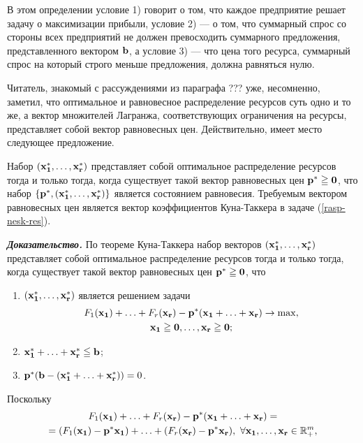     В этом определении условие 1) говорит о том, что каждое
    предприятие решает задачу о максимизации прибыли, условие 2) ---
    о том, что суммарный спрос со стороны всех предприятий не должен
    превосходить суммарного предложения, представленного вектором
    $\mathbf{b}$, а условие 3) --- что цена того ресурса, суммарный спрос на который
    строго меньше предложения, должна равняться нулю.

    Читатель, знакомый с рассуждениями из параграфа ??? уже, несомненно, заметил,
    что оптимальное и равновесное распределение ресурсов суть одно и
    то же, а вектор множителей Лагранжа, соответствующих ограничения на
    ресурсы, представляет собой вектор равновесных цен.
     Действительно, имеет место следующее предложение.
\begin{prop}\label{opt=ravn}
    Набор $(\mathbf{x_{1}^{*}},\ldots,\mathbf{x_{r}^{*}})$ представляет
    собой оптимальное распределение ресурсов тогда и только тогда,
    когда существует такой вектор равновесных цен
    $\mathbf{p^{*}}\geqq\mathbf{0}$, что набор
    $\{\mathbf{p^{*}}, (\mathbf{x_{1}^{*}},\ldots,\mathbf{x_{r}^{*}})\}$
    является состоянием равновесия. Требуемым вектором равновесных
    цен является вектор коэффициентов Куна-Таккера в задаче
    (\ref{rasp-nesk-res}).
\end{prop}
    \emph{\textbf{Доказательство.}}  По теореме Куна-Таккера набор
    векторов $(\mathbf{x_{1}^{*}},\ldots,\mathbf{x_{r}^{*}})$ представляет
    собой оптимальное распределение ресурсов тогда и только тогда,
    когда существует такой вектор равновесных цен
    $\mathbf{p^{*}}\geqq\mathbf{0}$, что
    \begin{enumerate}
  \item $(\mathbf{x_{1}^{*}},\ldots,\mathbf{x_{r}^{*}})$ является
    решением задачи
\begin{multline}\label{max-summy}
    F_{1}(\mathbf{x_{1}})+\ldots+F_{r}(\mathbf{x_{r}})
    -\mathbf{p^{*}}(\mathbf{x_{1}}+\ldots+\mathbf{x_{r}})
    \rightarrow \max,
    \\ \mathbf{x_{1}}\geqq\mathbf{0},\ldots,\mathbf{x_{r}}\geqq\mathbf{0};
\end{multline}
  \item $\mathbf{x_{1}^{*}}+\ldots+\mathbf{x_{r}^{*}}\leqq\mathbf{b}$;
  \item
  $\mathbf{p^{*}}(\mathbf{b}-(\mathbf{x_{1}^{*}}+\ldots+\mathbf{x_{r}^{*}}))=0$.
\end{enumerate}
    Поскольку
\begin{multline*}
    F_{1}(\mathbf{x_{1}})+\ldots+F_{r}(\mathbf{x_{r}})
    -\mathbf{p^{*}}(\mathbf{x_{1}}+\ldots+\mathbf{x_{r}})= \\
    =(F_{1}(\mathbf{x_{1}})-\mathbf{p^{*}}\mathbf{x_{1}})+\ldots+(F_{r}(\mathbf{x_{r}})-\mathbf{p^{*}}\mathbf{x_{r}}),
    \ \forall \mathbf{x_{1}},\ldots,\mathbf{x_{r}}\in\mathbb{R}^{m}_{+},
\end{multline*}
